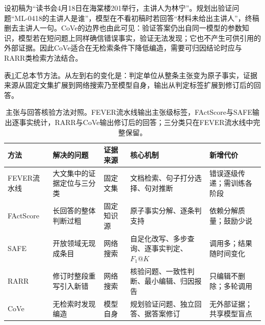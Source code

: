 设初稿为“读书会4月18日在海棠楼201举行，主讲人为林宁”。规划出验证问题“ML-0418的主讲人是谁”，模型在不看初稿时若回答“材料未给出主讲人”，终稿删去主讲人一句。CoVe的边界也由此可见：验证答案仍出自同一模型的参数知识，模型若在短问题上同样确信错误事实，验证无法发现；它也不产生可供引用的外部证据。因此CoVe适合在无检索条件下降低编造，需要可归因结论时应与RARR类检索方法结合。

表\ref{tab:nlp-dialogue-verification-methods}汇总本节方法。从左到右的变化是：判定单位从整条主张变为原子事实，证据来源从固定文集扩展到网络搜索乃至模型自身，输出从判定标签扩展到修订后的回答。

\begin{table}[htbp]
\centering
\small
\begin{tabular}{p{18mm}p{30mm}p{28mm}p{32mm}p{36mm}}
\toprule
方法 & 解决的问题 & 证据来源 & 核心机制 & 新增代价 \\
\midrule
FEVER流水线 & 大文集中的证据定位与三分类 & 固定文集 & 文档检索、句子打分选择、句对推断 & 错误逐级传递；需训练各阶段 \\
FActScore & 长回答的整体判断过粗 & 固定知识源 & 原子事实分解、逐条判支持 & 依赖分解质量；鼓励少说 \\
SAFE & 开放领域无现成条目 & 网络搜索 & 自足化改写、多步查询、逐事实判定、$F_1@K$ & 调用多；结果随时间变化 \\
RARR & 修订时整段重写引入新错 & 网络搜索 & 核验问题、一致性判断、最小编辑、归因报告 & 只编辑不删除；多轮调用 \\
CoVe & 无检索时发现编造 & 模型自身 & 规划验证问题、独立回答、据答案修订 & 无外部证据；共享模型盲点 \\
\bottomrule
\end{tabular}
\caption{主张与回答核验方法对照。FEVER流水线输出主张级标签，FActScore与SAFE输出逐事实统计，RARR与CoVe输出修订后的回答；三分类只在FEVER流水线中完整保留。}
\label{tab:nlp-dialogue-verification-methods}
\end{table}
